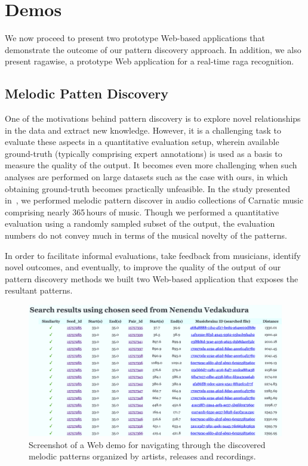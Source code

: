 \section{Demos}
\label{sec:demos}

We now proceed to present two prototype Web-based applications that demonstrate the outcome of our pattern discovery approach. In addition, we also present ragawise, a prototype Web application for a real-time raga recognition. 

\subsection*{Melodic Patten Discovery}

One of the motivations behind pattern discovery is to explore novel relationships in the data and extract new knowledge. However, it is a challenging task to evaluate these aspects  in a quantitative evaluation setup, wherein available ground-truth (typically comprising expert annotations) is used as a basis to measure the quality of the output. It becomes even more challenging when such analyses are performed on large datasets such as the case with ours, in which obtaining ground-truth becomes practically unfeasible.  In the study presented in~\secref{}, we performed melodic pattern discover in audio collections of Carnatic music comprising nearly 365\,hours of music. Though we performed a quantitative evaluation using a randomly sampled subset of the output, the evaluation numbers do not convey much in terms of the musical novelty of the patterns. 

In order to facilitate informal evaluations, take feedback from musicians, identify novel outcomes, and eventually, to improve the quality of the output of our pattern discovery methods we built two Web-based application that exposes the resultant patterns. 

\begin{figure}
	\begin{center}
		\includegraphics[width=\figSizeHundred]{ch08_applications/figures/patternBrowsing1.png}
	\end{center}
	\caption{Screenshot of a Web demo for navigating through the discovered melodic patterns organized by artists, releases and recordings.}
	\label{fig:browser_patterns}
\end{figure}

